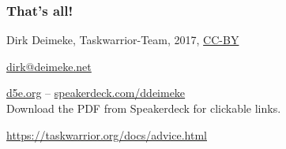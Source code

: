 \documentclass[t,handout,aspectratio=169]{beamer}
\begin{document}
\begin{frame}[fragile]\frametitle{That's all!}
    \vfill
    \begin{center}
        Dirk Deimeke, Taskwarrior-Team, 2017, \href{https://creativecommons.org/licenses/by/4.0/}{CC-BY}

        \href{mailto:dirk@deimeke.net}{dirk@deimeke.net}

        \href{https://d5e.org/}{d5e.org} -- \href{https://speakerdeck.com/ddeimeke}{speakerdeck.com/ddeimeke} \\
        {\tiny Download the PDF from Speakerdeck for clickable links.}

        \href{taskwarrior.org/docs/advice.html}{https://taskwarrior.org/docs/advice.html}
    \end{center}
\end{frame}
\end{document}
